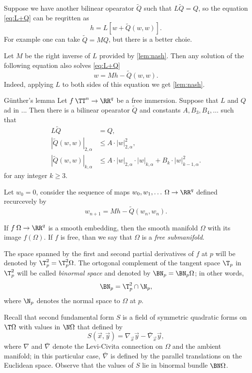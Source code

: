 Suppose we have another bilinear opearator $\tilde Q$ such that 
$L\tilde Q=Q$, so the equation \ref{eq:L+Q} can be reqritten as 
\[h=L[w+\tilde Q(w,w)].\]
For example one can take $\tilde Q=MQ$, but there is a better choie.

Let $M$ be the right inverse of $L$ provided by \ref{lem:nash}.
Then any solution of the following equation also solves \ref{eq:L+Q}
\[w=Mh-\tilde Q(w,w).\]
Indeed, applying $L$ to both sides of this equation we get  \ref{lem:nash}.

\begin{thm}{G\"{u}nther's lemma}\label{lem:guenther}
Let $f\:\TT^n\to \RR^q$ be a free immersion.
Suppose that $L$ and $Q$ ad in ... 
Then there is a bilinear opearator $\tilde Q$ and constants $A,B_3,B_4,\dots$ such that
\begin{align*}
L\tilde Q&=Q,
\\
|\tilde Q(w,w)|_{2,\alpha}&\le A\cdot  |w|^2_{2,\alpha},
\\
|\tilde Q(w,w)|_{k,\alpha}
&\le A\cdot |w|_{2,\alpha}\cdot |w|_{k,\alpha}
+
B_k\cdot |w|_{k-1,\alpha}^2.
\end{align*}
for any integer $k\ge 3$.

\end{thm}






Let $w_0=0$, consider the sequence of maps $w_0,w_1,\dots\:\Omega\to \RR^q$ defined recurcevely by
\[w_{n+1}=Mh-\tilde Q(w_n,w_n).\]















If $f\:\Omega \to \RR^q$ is a smooth embedding, then the smooth manifold $\Omega$ with its image $f(\Omega )$.
If $f$ is free, than we say that $\Omega$ is a \emph{free submanifold}.

The space spanned by the first and second partial derivatives of $f$ at $p$ will be denoted by $\T^2_p=\T^2_p\Omega$.
The ortogonal complement of the tangent space $\T_p$ in $\T^2_p$ will be called \emph{binormal space} and denoted by $\BN_p=\BN_p\Omega$; in other words,
\[\BN_p=\T^2_p\cap\N_p,\]
where $\N_p$ denotes the normal space to $\Omega$ at $p$.

Recall that second fundamental form $S$ is a field of symmetric quadratic forms on $\T \Omega$  with values in $\N \Omega$ that defined by 
\[S(\vec x,\vec y)=\nabla_{\vec x}\vec y-\bar\nabla_{\vec x}\vec y,\]
where $\nabla$ and $\bar \nabla$ denote the Levi-Civita connection on $\Omega$ and the ambient manifold;
in this particular case, $\bar \nabla$ is defined by the parallel translations on the Euclidean space.
Observe that the values of $S$ lie in binormal bundle $\BN \Omega$.

